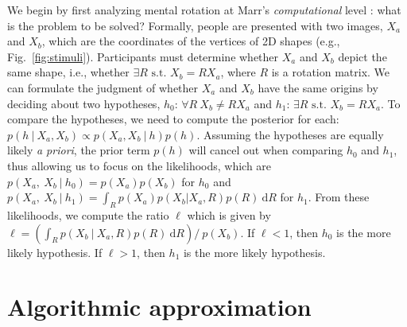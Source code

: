\documentclass{article} %
\begin{document}
We begin by first analyzing mental rotation at Marr's
\textit{computational} level \cite{Marr:1983to}: what is the problem
to be solved?  Formally, people are presented with two images, $X_a$
and $X_b$, which are the coordinates of the vertices of 2D shapes
(e.g., Fig.~\ref{fig:stimuli}). Participants must determine whether
$X_a$ and $X_b$ depict the same shape, i.e., whether $\exists
R\textrm{ s.t. } X_b=RX_a$, where $R$ is a rotation matrix. We can
formulate the judgment of whether $X_a$ and $X_b$ have the same
origins by deciding about two hypotheses, $h_0$: $\forall R\ X_b\neq
RX_a$ and $h_1$: $\exists R\textrm{ s.t. } X_b=RX_a$.  To compare the
hypotheses, we need to compute the posterior for each: $p(h\ \vert\
X_a, X_b)\propto p(X_a, X_b\ \vert\ h)p(h)$. Assuming the hypotheses
are equally likely \textit{a priori}, the prior term $p(h)$ will
cancel out when comparing $h_0$ and $h_1$, thus allowing us to focus
on the likelihoods, which are $p(X_a,\ X_b\ \vert \ h_0)=p(X_a)p(X_b)$
for $h_0$ and $p(X_a,\ X_b\ \vert \ h_1)=\int_R p(X_a) p(X_b\vert
X_a,R) p(R)\ \mathrm{d}R$ for $h_1$. From these likelihoods, we
compute the ratio $\ell$ which is given by $\ell=\left(\int_R p(X_b\
  \vert\ X_a, R)p(R)\ \mathrm{d}R\right) /\ p(X_b)$. If $\ell<1$, then
$h_0$ is the more likely hypothesis. If $\ell>1$, then $h_1$ is the
more likely hypothesis.

\section{Algorithmic approximation}
\end{document}
